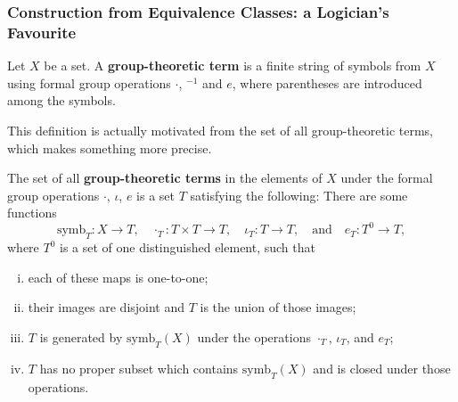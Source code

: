 \subsubsection{Construction from Equivalence Classes: a Logician's Favourite}
\begin{definition}
	Let $X$ be a set. A \textbf{group-theoretic term} is a finite string of symbols from $X$ using formal group operations $\cdot$, ${}^{-1}$ and $e$, where  parentheses are introduced
	among the symbols.
\end{definition}
This definition is actually motivated from the set of all group-theoretic terms, which makes something more precise.
\begin{definition}
 The set of all \textbf{group-theoretic terms} in the elements of $X$ under the formal group operations $\cdot$, $\iota$, $e$ is a set $T$ satisfying the following: There are some functions
 \[
 \text{symb}_T: X \to T, \quad \cdot_T: T\times T \to T, \quad \iota_T: T \to T, \quad \text{and} \quad e_T: T^0 \to T,
 \]
 where $T^0$ is a set of one distinguished element, such that
\begin{enumerate}[(i)]
	\item  each of these maps is one-to-one;
	\item  their images are disjoint and $T$ is the union of those images; 
	\item $T$ is generated by $\text{symb}_T(X)$ under the operations $\cdot_T$, $\iota_T$, and $e_T$;
	\item $T$ has no proper subset which contains $\text{symb}_T(X)$ and is closed under those operations.
\end{enumerate}
\end{definition}

